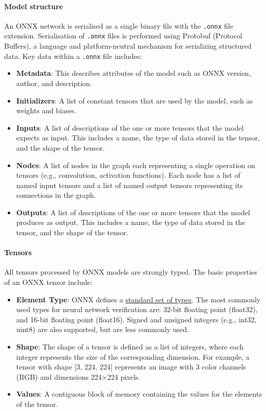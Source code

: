 \paragraph{Model structure} 

An ONNX network is serialised as a single binary file with the \texttt{.onnx} file extension. Serialisation of \texttt{.onnx} files is performed using Protobuf (Protocol Buffers), a language and platform-neutral mechanism for serializing structured data. 
Key data within a \texttt{.onnx} file includes:
\begin{itemize}
	\item \textbf{Metadata}: This describes attributes of the model such as ONNX version, author, and description.
	\item \textbf{Initializers}: A list of constant tensors that are used by the model, such as weights and biases.
	\item \textbf{Inputs}: A list of descriptions of the one or more tensors that the model expects as input. This includes a name, the type of data stored in the tensor, and the shape of the tensor.
	\item \textbf{Nodes}: A list of nodes in the graph each representing a single operation on tensors (e.g., convolution, activation functions). Each node has a list of named input tensors and a list of named output tensors representing its connections in the graph.
	\item \textbf{Outputs}: A list of descriptions of the one or more tensors that the model produces as output. This includes a name, the type of data stored in the tensor, and the shape of the tensor.
\end{itemize}


\paragraph{Tensors}
All tensors processed by ONNX models are strongly typed. The basic properties of an ONNX tensor include:
\begin{itemize}
	\item \textbf{Element Type}: ONNX defines a \href{https://onnx.ai/onnx/repo-docs/IR.html#tensor-element-types}{standard set of types}. 
	The most commonly used types for neural network verification are: 32-bit floating point (float32), and 16-bit floating point (float16). Signed and unsigned integers (e.g., int32, uint8) are also supported, but are less commonly used.
	\item \textbf{Shape}: The shape of a tensor is defined as a list of integers, where each integer represents the size of the corresponding dimension. For example, a tensor with shape [3, 224, 224] 
	represents an image with 3 color channels (RGB) and dimensions 224\(\times\)224 pixels.
	\item \textbf{Values}: A contiguous block of memory containing the values for the elements of the tensor.
\end{itemize}

